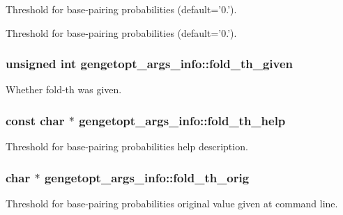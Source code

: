 Threshold for base-\/pairing probabilities (default='0.'). 

Threshold for base-\/pairing probabilities (default='0.'). \hypertarget{structgengetopt__args__info_a0a5f7a2dde96bfe36799ed2d38282f75}{
\subsubsection[{fold\+\_\+th\+\_\+given}]{\setlength{\rightskip}{0pt plus 5cm}unsigned int gengetopt\+\_\+args\+\_\+info\+::fold\+\_\+th\+\_\+given}}\label{structgengetopt__args__info_a0a5f7a2dde96bfe36799ed2d38282f75}


Whether fold-\/th was given. 

\hypertarget{structgengetopt__args__info_a91fb17190d2ee0c11ba6c6ac16a8be5e}{
\subsubsection[{fold\+\_\+th\+\_\+help}]{\setlength{\rightskip}{0pt plus 5cm}const char $\ast$ gengetopt\+\_\+args\+\_\+info\+::fold\+\_\+th\+\_\+help}}\label{structgengetopt__args__info_a91fb17190d2ee0c11ba6c6ac16a8be5e}


Threshold for base-\/pairing probabilities help description. 

\hypertarget{structgengetopt__args__info_a281837484d9e42893a583d0a850cd610}{
\subsubsection[{fold\+\_\+th\+\_\+orig}]{\setlength{\rightskip}{0pt plus 5cm}char $\ast$ gengetopt\+\_\+args\+\_\+info\+::fold\+\_\+th\+\_\+orig}}\label{structgengetopt__args__info_a281837484d9e42893a583d0a850cd610}


Threshold for base-\/pairing probabilities original value given at command line. 

